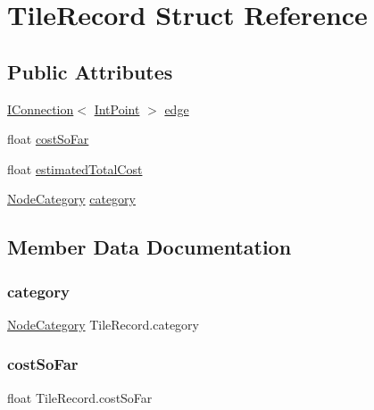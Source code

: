 \hypertarget{struct_tile_record}{}\section{Tile\+Record Struct Reference}
\label{struct_tile_record}
\subsection*{Public Attributes}
\begin{DoxyCompactItemize}
\item 
\mbox{\hyperlink{interface_i_connection}{I\+Connection}}$<$ \mbox{\hyperlink{struct_int_point}{Int\+Point}} $>$ \mbox{\hyperlink{struct_tile_record_acf607b02b02de7d586a00a75f341fe5e}{edge}}
\item 
float \mbox{\hyperlink{struct_tile_record_ab47bc9e2be8dc1b0a165147d2fc11d2f}{cost\+So\+Far}}
\item 
float \mbox{\hyperlink{struct_tile_record_ab2f27c5059450f78975ed349cd671b70}{estimated\+Total\+Cost}}
\item 
\mbox{\hyperlink{_graph_types_8cs_aeaefcb909e173fc6cbac62eca33b14f9}{Node\+Category}} \mbox{\hyperlink{struct_tile_record_ab64ecbc183f80275df4199c6215224bd}{category}}
\end{DoxyCompactItemize}


\subsection{Member Data Documentation}
\mbox{\label{struct_tile_record_ab64ecbc183f80275df4199c6215224bd}} 
\subsubsection{\texorpdfstring{category}{category}}
{\footnotesize\ttfamily \mbox{\hyperlink{_graph_types_8cs_aeaefcb909e173fc6cbac62eca33b14f9}{Node\+Category}} Tile\+Record.\+category}

\mbox{\label{struct_tile_record_ab47bc9e2be8dc1b0a165147d2fc11d2f}} 
\subsubsection{\texorpdfstring{cost\+So\+Far}{costSoFar}}
{\footnotesize\ttfamily float Tile\+Record.\+cost\+So\+Far}

